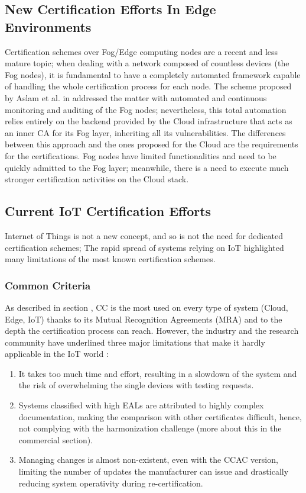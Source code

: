 \subsection{New Certification Efforts In Edge Environments}
Certification schemes over Fog/Edge computing nodes are a recent and less mature topic; when dealing with a network composed of countless devices (the Fog nodes), it is fundamental to have a completely automated framework capable of handling the whole certification process for each node. The scheme proposed by Aslam et al. in \cite{aslam2020fonac} addressed the matter with automated and continuous monitoring and auditing of the Fog nodes; nevertheless, this total automation relies entirely on the backend provided by the Cloud infrastructure that acts as an inner CA for its Fog layer, inheriting all its vulnerabilities. The differences between this approach and the ones proposed for the Cloud are the requirements for the certifications. Fog nodes have limited functionalities and need to be quickly admitted to the Fog layer; meanwhile, there is a need to execute much stronger certification activities on the Cloud stack.

\subsection{Current IoT Certification Efforts}
Internet of Things is not a new concept, and so is not the need for dedicated certification schemes; The rapid spread of systems relying on IoT highlighted many limitations of the most known certification schemes.

\subsubsection{Common Criteria}
As described in section , CC is the most used on every type of system (Cloud, Edge, IoT) thanks to its Mutual Recognition Agreements (MRA) and to the depth the certification process can reach. However, the industry and the research community have underlined three major limitations that make it hardly applicable in the IoT world \cite{kaluvuri2014quantitative}\cite{keblawi2006applying}:
\begin{enumerate}
    \item It takes too much time and effort, resulting in a slowdown of the system and the risk of overwhelming the single devices with testing requests.
    \item Systems classified with high EALs are attributed to highly complex documentation, making the comparison with other certificates difficult, hence, not complying with the harmonization challenge (more about this in the commercial section).
    \item Managing changes is almost non-existent, even with the CCAC version, limiting the number of updates the manufacturer can issue and drastically reducing system operativity during re-certification.
\end{enumerate}


